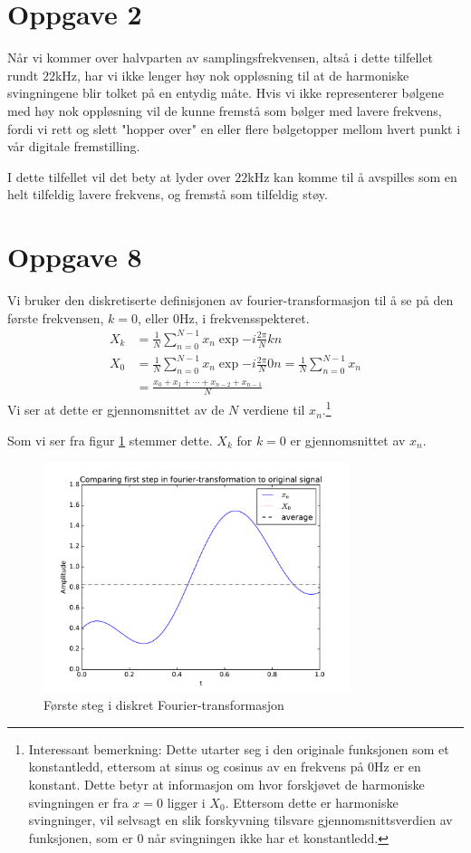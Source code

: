 \documentclass[12p,a4paper]{article}
\begin{document}
\section*{Oppgave 2}\label{sec:2}
Når vi kommer over halvparten av samplingsfrekvensen, altså i dette tilfellet rundt $22$kHz, har vi ikke lenger høy nok oppløsning til at de harmoniske svingningene blir tolket på en entydig måte. Hvis vi ikke representerer bølgene med høy nok oppløsning vil de kunne fremstå som bølger med lavere frekvens, fordi vi rett og slett "hopper over" en eller flere bølgetopper mellom hvert punkt i vår digitale fremstilling.

I dette tilfellet vil det bety at lyder over $22$kHz kan komme til å avspilles som en helt tilfeldig lavere frekvens, og fremstå som tilfeldig støy.


\section*{Oppgave 8}
Vi bruker den diskretiserte definisjonen av fourier-transformasjon til å se på den første frekvensen, $k=0$, eller 0Hz, i frekvensspekteret.
\begin{align*}
X_k &= \frac{1}{N} \sum\limits_{n=0}^{N-1} x_n \exp{-i\frac{2\pi}{N}kn} \\
X_0 &= \frac{1}{N} \sum\limits_{n=0}^{N-1} x_n \exp{-i\frac{2\pi}{N}0n} = \frac{1}{N} \sum\limits_{n=0}^{N-1} x_n \\
&= \frac{x_0 + x_1 + \cdots + x_{n-2} + x_{n-1}}{N}
\end{align*}
Vi ser at dette er gjennomsnittet av de $N$ verdiene til $x_n$.\footnote{Interessant bemerkning: Dette utarter seg i den originale funksjonen som et konstantledd, ettersom at sinus og cosinus av en frekvens på 0Hz er en konstant. Dette betyr at informasjon om hvor forskjøvet de harmoniske svingningen er fra $x=0$ ligger i $X_0$. Ettersom dette er harmoniske svingninger, vil selvsagt en slik forskyvning tilsvare gjennomsnittsverdien av funksjonen, som er 0 når svingningen ikke har et konstantledd.}

\pagebreak

Som vi ser fra figur \ref{fig:average} stemmer dette. $X_k$ for $k=0$ er gjennomsnittet av $x_n$.

\begin{figure}[H]
\centering
\includegraphics[width=0.8\textwidth]{fig/average.pdf}
\caption{Første steg i diskret Fourier-transformasjon}
\label{fig:average}
\end{figure}
\end{document}
